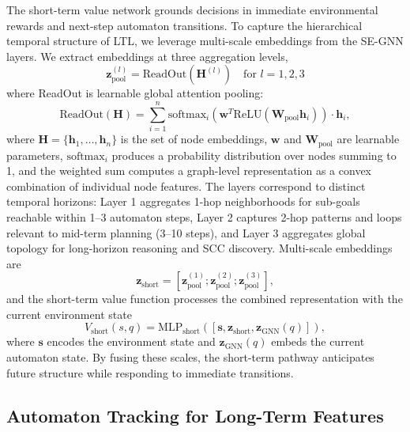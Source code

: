 \documentclass[journal]{IEEEtran}
\begin{document}
The short-term value network grounds decisions in immediate environmental rewards and next-step automaton transitions. To capture the hierarchical temporal structure of LTL, we leverage multi-scale embeddings from the SE-GNN layers.
We extract embeddings at three aggregation levels,
\begin{equation}
\mathbf{z}^{(l)}_{\text{pool}} = \text{ReadOut}(\mathbf{H}^{(l)}) \quad \text{for } l = 1, 2, 3
\label{eq:multiscale_readout}
\end{equation}
where ReadOut is learnable global attention pooling:
\begin{equation}
\label{eq:readout}
	\text{ReadOut}(\mathbf{H}) = \sum_{i=1}^{n} \text{softmax}_i(\mathbf{w}^T \text{ReLU}(\mathbf{W}_{\text{pool}} \mathbf{h}_i)) \cdot \mathbf{h}_i,
\end{equation}
where $\mathbf{H} = \{\mathbf{h}_1, \ldots, \mathbf{h}_n\}$ is the set of node embeddings, $\mathbf{w}$ and $\mathbf{W}_{\text{pool}}$ are learnable parameters, $\text{softmax}_i$ produces a probability distribution over nodes summing to 1, and the weighted sum computes a graph-level representation as a convex combination of individual node features. The layers correspond to distinct temporal horizons: Layer 1 aggregates 1-hop neighborhoods for sub-goals reachable within 1–3 automaton steps, Layer 2 captures 2-hop patterns and loops relevant to mid-term planning (3–10 steps), and Layer 3 aggregates global topology for long-horizon reasoning and SCC discovery. Multi-scale embeddings are 
\begin{equation}
\mathbf{z}_{\text{short}} = [\mathbf{z}_{\text{pool}}^{(1)}; \mathbf{z}_{\text{pool}}^{(2)}; \mathbf{z}_{\text{pool}}^{(3)}],
\end{equation}
and the short-term value function processes the combined representation with the current environment state
\begin{equation}
V_{\text{short}}(s, q) = \text{MLP}_{\text{short}}([\mathbf{s}, \mathbf{z}_{\text{short}}, \mathbf{z}_{\text{GNN}}(q)]),
\label{eq:short_value_comp}
\end{equation}
where $\mathbf{s}$ encodes the environment state and $\mathbf{z}_{\text{GNN}}(q)$ embeds the current automaton state. By fusing these scales, the short-term pathway anticipates future structure while responding to immediate transitions.

\subsection{Automaton Tracking for Long-Term Features}
\end{document}
